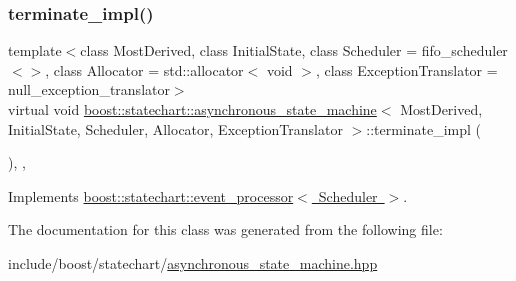 \mbox{\label{classboost_1_1statechart_1_1asynchronous__state__machine_a528bedaf8c4d4b3fefc78984673bf30b}} 
\subsubsection{\texorpdfstring{terminate\+\_\+impl()}{terminate\_impl()}}
{\footnotesize\ttfamily template$<$class Most\+Derived, class Initial\+State, class Scheduler = fifo\+\_\+scheduler$<$$>$, class Allocator = std\+::allocator$<$ void $>$, class Exception\+Translator = null\+\_\+exception\+\_\+translator$>$ \\
virtual void \mbox{\hyperlink{classboost_1_1statechart_1_1asynchronous__state__machine}{boost\+::statechart\+::asynchronous\+\_\+state\+\_\+machine}}$<$ Most\+Derived, Initial\+State, Scheduler, Allocator, Exception\+Translator $>$\+::terminate\+\_\+impl (\begin{DoxyParamCaption}{ }\end{DoxyParamCaption})\hspace{0.3cm}{\ttfamily [inline]}, {\ttfamily [private]}, {\ttfamily [virtual]}}



Implements \mbox{\hyperlink{classboost_1_1statechart_1_1event__processor_a3f5f4c757909fca5f389b485a789c24e}{boost\+::statechart\+::event\+\_\+processor$<$ Scheduler $>$}}.



The documentation for this class was generated from the following file\+:\begin{DoxyCompactItemize}
\item 
include/boost/statechart/\mbox{\hyperlink{asynchronous__state__machine_8hpp}{asynchronous\+\_\+state\+\_\+machine.\+hpp}}\end{DoxyCompactItemize}
